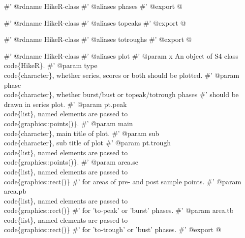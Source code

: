 \documentclass[a4paper]{article}
\begin{document}
\nwenddocs{}\endmoddef
#' @rdname HikeR-class
#' @aliases phases
#' @export
\nwendcode{}@

\nwenddocs{}\endmoddef
#' @rdname HikeR-class
#' @aliases topeaks
#' @export
\nwendcode{}@

\nwenddocs{}\endmoddef
#' @rdname HikeR-class
#' @aliases totroughs
#' @export
\nwendcode{}@

\nwenddocs{}\endmoddef
#' @rdname HikeR-class
#' @aliases plot
#' @param x An object of S4 class \\code\{HikeR\}.
#' @param type \\code\{character\}, whether series, scores or both should be plotted.
#' @param phase \\code\{character\}, whether burst/bust or topeak/totrough phases
#' should be drawn in series plot.
#' @param pt.peak \\code\{list\}, named elements are passed to \\code\{graphics::points()\}.
#' @param main \\code\{character\}, main title of plot.
#' @param sub \\code\{character\}, sub title of plot
#' @param pt.trough \\code\{list\}, named elements are passed to \\code\{graphics::points()\}.
#' @param area.se \\code\{list\}, named elements are passed to \\code\{graphics::rect()\}
#' for areas of pre- and post sample points.
#' @param area.pb \\code\{list\}, named elements are passed to \\code\{graphics::rect()\}
#' for 'to-peak' or 'burst' phases.
#' @param area.tb \\code\{list\}, named elements are passed to \\code\{graphics::rect()\}
#' for 'to-trough' or 'bust' phases.
#' @export
\nwendcode{}@
\end{document}
